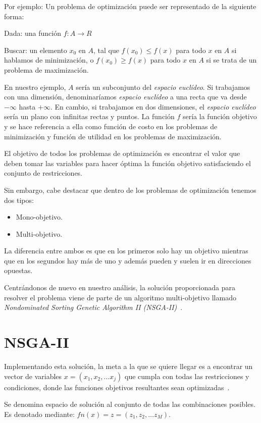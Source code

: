 Por ejemplo: Un problema de optimización puede ser representado de la siguiente forma:

Dada: una función $f : A \rightarrow R$

Buscar: un elemento $x_{0}$ en $A$, tal que $f(x_{0}) \leq f(x)$ para todo $x$ en $A$ si hablamos de minimización, o $f(x_{0}) \geq f(x)$ para todo $x$ en $A$ si se trata de un problema de maximización.

En nuestro ejemplo, $A$ sería un subconjunto del \textit{espacio euclídeo}. Si trabajamos con una dimensión, denominaríamos \textit{espacio euclídeo} a una recta que va desde $-\infty$ hasta $+\infty$. En cambio, si trabajamos en dos dimensiones, el \textit{espacio euclídeo} sería un plano con infinitas rectas y puntos.
La función $f$ sería la función objetivo y se hace referencia a ella como función de costo en los problemas de 
minimización y función de utilidad en los problemas de maximización.

El objetivo de todos los problemas de optimización es encontrar el valor que deben tomar las variables para hacer óptima la función objetivo satisfaciendo el conjunto de restricciones. 

Sin embargo, cabe destacar que dentro de los problemas de optimización tenemos dos tipos:
\begin{itemize}
	\item Mono-objetivo.
	\item Multi-objetivo.
\end{itemize}

La diferencia entre ambos es que en los primeros solo hay un objetivo mientras que en los segundos hay más de uno y además pueden y suelen ir en direcciones opuestas.

Centrándonos de nuevo en nuestro análisis, la solución proporcionada para resolver el problema viene de parte de un algoritmo multi-objetivo llamado \textit{Nondominated Sorting Genetic Algorithm II (NSGA-II)}~\cite{pdf:nsga-ii}.

\section{NSGA-II}

Implementando esta solución, la meta a la que se quiere llegar es a encontrar un vector de variables $x=(x_1,x_2,…x_j)$ que cumpla con todas las restricciones y condiciones, donde las funciones objetivos resultantes sean optimizadas~\cite{pdf:algoritmo}.

Se denomina espacio de solución al conjunto de todas las combinaciones posibles. Es denotado mediante: $fn(x)=z=(z_1,z_2,…z_M)$. 


